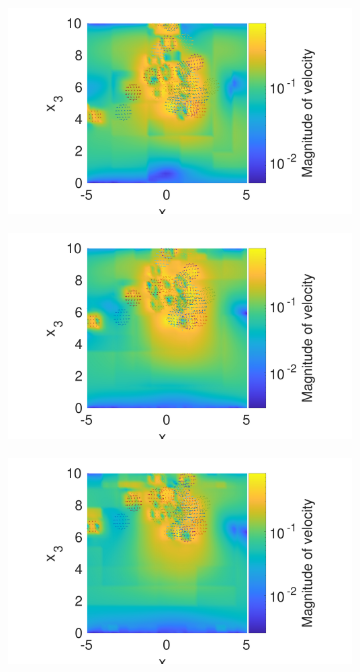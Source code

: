 \begin{figure}
\begin{subfigure}[b]{0.42\textwidth}
    \caption[]{\label{fig:squirmerE}}
\end{subfigure}
\begin{subfigure}[b]{0.42\textwidth}
    \centering
    \includegraphics[width=\textwidth]{Images/squirmers/Gyro-6.pdf}
    \caption[]{\label{fig:squirmerF}}
\end{subfigure}
\begin{subfigure}[b]{0.42\textwidth}
    \centering
    \includegraphics[width=\textwidth]{Images/squirmers/Gyro-7.pdf}
    \caption[]{\label{fig:squirmerG}}
\end{subfigure}
\begin{subfigure}[b]{0.42\textwidth}
    \centering
    \includegraphics[width=\textwidth]{Images/squirmers/Gyro-8.pdf}

\end{subfigure}
\end{figure}

